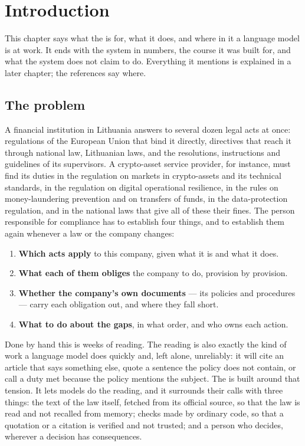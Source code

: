 \chapter{Introduction}\label{ch:intro}

This chapter says what the \product{} is for, what it does, and where in it a language model
is at work. It ends with the system in numbers, the course it was built for, and what the
system does not claim to do.
Everything it mentions is explained in a later chapter; the references say where.

\section{The problem}\label{sec:intro:problem}

A financial institution in Lithuania answers to several dozen legal acts at once: regulations
of the European Union that bind it directly, directives that reach it through national law,
Lithuanian laws, and the resolutions, instructions and guidelines of its supervisors. A
crypto-asset service provider, for instance, must find its duties in the regulation on markets
in crypto-assets and its technical standards, in the regulation on digital operational
resilience, in the rules on money-laundering prevention and on transfers of funds, in the
data-protection regulation, and in the national laws that give all of these their fines. The
person responsible for compliance has to establish four things, and to establish them again
whenever a law or the company changes:

\begin{enumerate}
  \item \textbf{Which acts apply} to this company, given what it is and what it does.
  \item \textbf{What each of them obliges} the company to do, provision by provision.
  \item \textbf{Whether the company's own documents} --- its policies and procedures --- carry
        each obligation out, and where they fall short.
  \item \textbf{What to do about the gaps}, in what order, and who owns each action.
\end{enumerate}

Done by hand this is weeks of reading. The reading is also exactly the kind of work a language
model does quickly and, left alone, unreliably: it will cite an article that says something
else, quote a sentence the policy does not contain, or call a duty met because the policy
mentions the subject. The \product{} is built around that tension. It lets models do the
reading, and it surrounds their calls with three things: the text of the law itself,
fetched from its official source, so that the law is read and not recalled from memory; checks made by
ordinary code, so that a quotation or a citation is verified and not trusted; and a person who
decides, wherever a decision has consequences.

